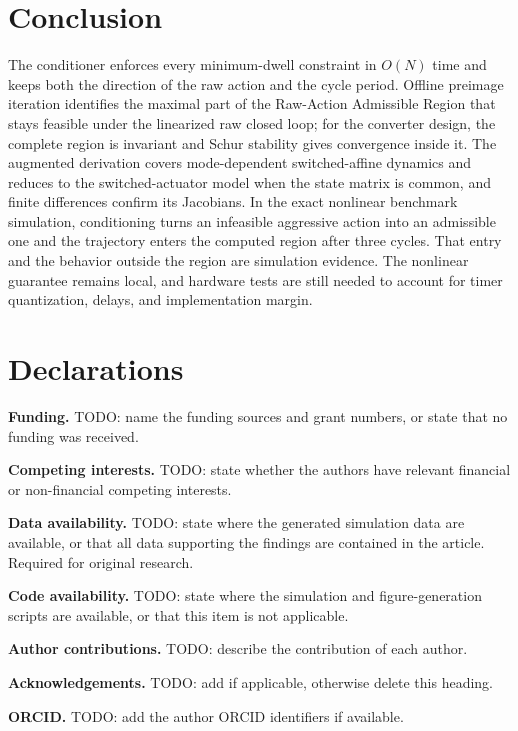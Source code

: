 \documentclass[pdflatex,iicol,sn-mathphys-ay]{sn-jnl}
\begin{document}
\section{Conclusion}

The conditioner enforces every minimum-dwell constraint in $O(N)$ time and keeps both the direction of the raw action and the cycle period. Offline preimage iteration identifies the maximal part of the Raw-Action Admissible Region that stays feasible under the linearized raw closed loop; for the converter design, the complete region is invariant and Schur stability gives convergence inside it. The augmented derivation covers mode-dependent switched-affine dynamics and reduces to the switched-actuator model when the state matrix is common, and finite differences confirm its Jacobians. In the exact nonlinear benchmark simulation, conditioning turns an infeasible aggressive action into an admissible one and the trajectory enters the computed region after three cycles. That entry and the behavior outside the region are simulation evidence. The nonlinear guarantee remains local, and hardware tests are still needed to account for timer quantization, delays, and implementation margin.

\backmatter
\section*{Declarations}
\textbf{Funding.} TODO: name the funding sources and grant numbers, or state that no funding was received.

\textbf{Competing interests.} TODO: state whether the authors have relevant financial or non-financial competing interests.

\textbf{Data availability.} TODO: state where the generated simulation data are available, or that all data supporting the findings are contained in the article. Required for original research.

\textbf{Code availability.} TODO: state where the simulation and figure-generation scripts are available, or that this item is not applicable.

\textbf{Author contributions.} TODO: describe the contribution of each author.

\textbf{Acknowledgements.} TODO: add if applicable, otherwise delete this heading.

\textbf{ORCID.} TODO: add the author ORCID identifiers if available.


\end{document}
